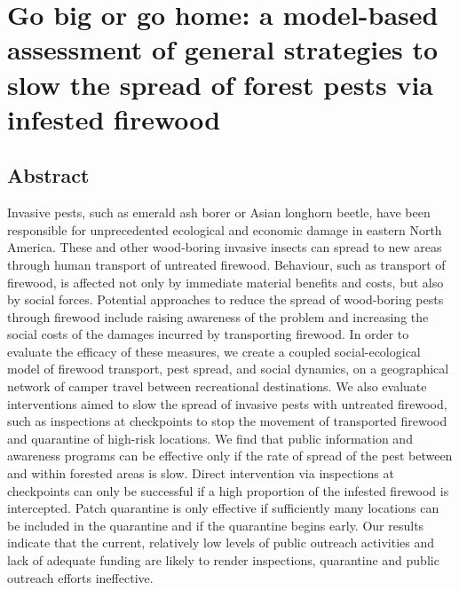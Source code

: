 \chapter{Go big or go home: a model-based assessment of general strategies to slow the spread of forest pests via infested firewood}
\label{ch2}
\vspace*{0.2in}

\section{Abstract}
Invasive pests, such as emerald ash borer or Asian longhorn beetle, have been responsible for unprecedented ecological and economic damage in eastern North America. These and other wood-boring invasive insects can spread to new areas through human transport of untreated firewood. Behaviour, such as transport of firewood, is affected not only by immediate material benefits and costs, but also by social forces. Potential approaches to reduce the spread of wood-boring pests through firewood include raising awareness of the problem and increasing the social costs of the damages incurred by transporting firewood. In order to evaluate the efficacy of these measures, we create a coupled social-ecological model of firewood transport, pest spread, and social dynamics, on a geographical network of camper travel between recreational destinations. We also evaluate interventions aimed to slow the spread of invasive pests with untreated firewood, such as inspections at checkpoints to stop the movement of transported firewood and quarantine of high-risk locations. We find that public information and awareness programs can be effective only if the rate of spread of the pest between and within forested areas is slow. Direct intervention via inspections at checkpoints can only be successful if a high proportion of the infested firewood is intercepted. Patch quarantine is only effective if sufficiently many locations can be included in the quarantine and if the quarantine begins early. Our results indicate that the current, relatively low levels of public outreach activities and lack of adequate funding are likely to render inspections, quarantine and public outreach efforts ineffective.


